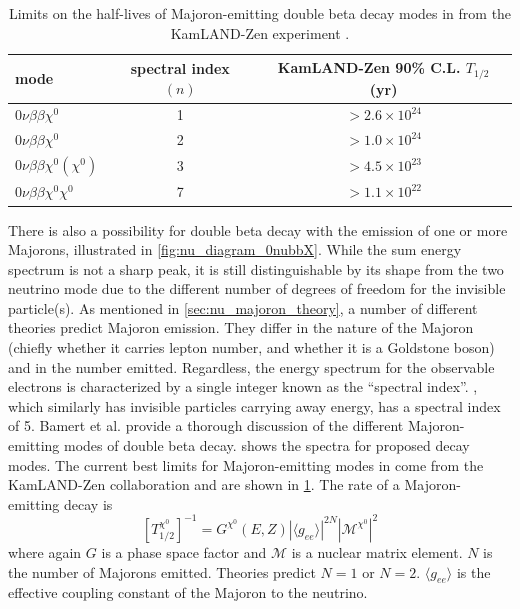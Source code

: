 \documentclass[herrin-thesis.tex]{subfiles}
\begin{document}
\begin{table}[tbp]
\centering
\caption[Current \(0\nu\beta\beta\chi^{0}(\chi^{0})\) limits]{Limits on the half-lives of Majoron-emitting double beta decay modes in  from the KamLAND-Zen experiment \cite{Gando:2012fk}.}
\label{tab:nu_majoron_limits}
\begin{tabular}{l c c}\toprule
	mode						&	spectral index \((n)\)		&	KamLAND-Zen 90\% C.L. \(T_{1/2}\) (yr)		\\\midrule
	\(0\nu\beta\beta\chi^{0}\)			&	1					&	\(>2.6\times10^{24}\)						\\
	\(0\nu\beta\beta\chi^{0}\)			&	2					&	\(>1.0\times10^{24}\)						\\
	\(0\nu\beta\beta\chi^{0}(\chi^{0})\)	&	3					&	\(>4.5\times10^{23}\)						\\
	\(0\nu\beta\beta\chi^{0}\chi^{0}\)	&	7					&	\(>1.1\times10^{22}\)						\\\bottomrule
\end{tabular}
\end{table}

There is also a possibility for double beta decay with the emission of one or more Majorons, illustrated in \cref{fig:nu_diagram_0nubbX}. While the sum energy spectrum is not a sharp peak, it is still distinguishable by its shape from the two neutrino mode due to the different number of degrees of freedom for the invisible particle(s). As mentioned in \cref{sec:nu_majoron_theory}, a number of different theories predict Majoron emission. They differ in the nature of the Majoron (chiefly whether it carries lepton number, and whether it is a Goldstone boson) and in the number emitted. Regardless, the energy spectrum for the observable electrons is characterized by a single integer known as the ``spectral index''. \twonu{}, which similarly has invisible particles carrying away energy, has a spectral index of 5. Bamert et al. \cite{Bamert:1995fk} provide a thorough discussion of the different Majoron-emitting modes of double beta decay.  shows the spectra for proposed decay modes. The current best limits for Majoron-emitting modes in  come from the KamLAND-Zen collaboration \cite{Gando:2012fk} and are shown in \cref{tab:nu_majoron_limits}. The rate of a Majoron-emitting decay is
\begin{equation}
\left [ T^{\chi^0}_{1/2} \right ]^{-1} = G^{\chi^{0}}\left(E, Z\right)\left | \langle g_{e e} \rangle \right |^{2N}\left | \mathcal{M}^{\chi^{0}}\right |^2
\label{eq:nu_majoron_rate}
\end{equation}
where again \(G\) is a phase space factor and \(\mathcal{M}\) is a nuclear matrix element. \(N\) is the number of Majorons emitted. Theories predict \(N=1\) or \(N=2\). \(\langle g_{e e} \rangle\) is the effective coupling constant of the Majoron to the neutrino.
\end{document}
